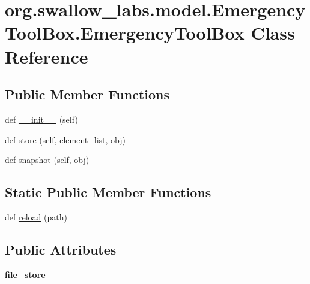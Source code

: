 \hypertarget{classorg_1_1swallow__labs_1_1model_1_1_emergency_tool_box_1_1_emergency_tool_box}{}\section{org.\+swallow\+\_\+labs.\+model.\+Emergency\+Tool\+Box.\+Emergency\+Tool\+Box Class Reference}
\label{classorg_1_1swallow__labs_1_1model_1_1_emergency_tool_box_1_1_emergency_tool_box}
\subsection*{Public Member Functions}
\begin{DoxyCompactItemize}
\item 
def \hyperlink{classorg_1_1swallow__labs_1_1model_1_1_emergency_tool_box_1_1_emergency_tool_box_a24e1fa1d5664369ac64fa6b45410a6b7}{\+\_\+\+\_\+init\+\_\+\+\_\+} (self)
\item 
def \hyperlink{classorg_1_1swallow__labs_1_1model_1_1_emergency_tool_box_1_1_emergency_tool_box_aef073e74014974f160e0fb7dc28a08ce}{store} (self, element\+\_\+list, obj)
\item 
def \hyperlink{classorg_1_1swallow__labs_1_1model_1_1_emergency_tool_box_1_1_emergency_tool_box_aa14112645e954dd0f20ac3d686cdbc9b}{snapshot} (self, obj)
\end{DoxyCompactItemize}
\subsection*{Static Public Member Functions}
\begin{DoxyCompactItemize}
\item 
def \hyperlink{classorg_1_1swallow__labs_1_1model_1_1_emergency_tool_box_1_1_emergency_tool_box_a2d1b47a07a667694728b06f05b00567d}{reload} (path)
\end{DoxyCompactItemize}
\subsection*{Public Attributes}
\begin{DoxyCompactItemize}
\item 
\hypertarget{classorg_1_1swallow__labs_1_1model_1_1_emergency_tool_box_1_1_emergency_tool_box_a883bd55e3480f580d1618ddbda8bb123}{}{\bfseries file\+\_\+store}\label{classorg_1_1swallow__labs_1_1model_1_1_emergency_tool_box_1_1_emergency_tool_box_a883bd55e3480f580d1618ddbda8bb123}

\end{DoxyCompactItemize}


